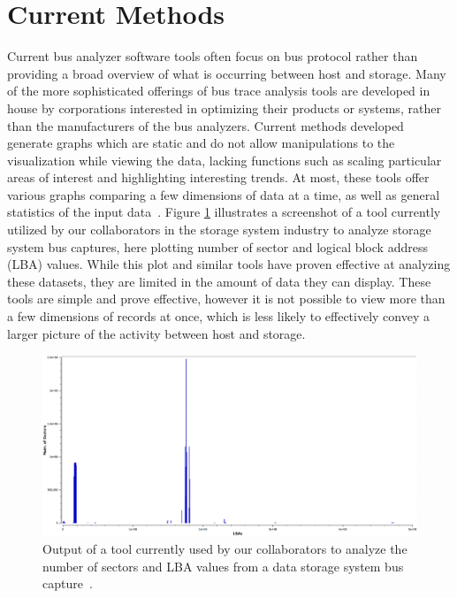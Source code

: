 \documentclass[12pt]{ucthesis}
\begin{document}
\section{Current Methods}
\label{current_methods}

Current bus analyzer software tools often focus on bus protocol rather than providing a broad overview of what is occurring between host and storage. Many of the more sophisticated offerings of bus trace analysis tools are developed in house by corporations interested in optimizing their products or systems, rather than the manufacturers of the bus analyzers. Current methods developed generate graphs which are static and do not allow manipulations to the visualization while viewing the data, lacking functions such as scaling particular areas of interest and highlighting interesting trends. At most, these tools offer various graphs comparing a few dimensions of data at a time, as well as general statistics of the input data~\cite{internal:understanding}. Figure \ref{fig:prev_tool2} illustrates a screenshot of a tool currently utilized by our collaborators in the storage system industry to analyze storage system bus captures, here plotting number of sector and logical block address (LBA) values. While this plot and similar tools have proven effective at analyzing these datasets, they are limited in the amount of data they can display. These tools are simple and prove effective, however it is not possible to view more than a few dimensions of records at once, which is less likely to effectively convey a larger picture of the activity between host and storage.

\begin{figure}[h!]
 \centering
 \includegraphics[width=\textwidth]{images/prev_tool2.jpg}
 \caption[Output of a tool currently used to analyze workload datasets.]{Output of a tool currently used by our collaborators to analyze the number of sectors and LBA values from a data storage system bus capture~\cite{internal:collab}.}
 \label{fig:prev_tool2}
\end{figure}
\end{document}

